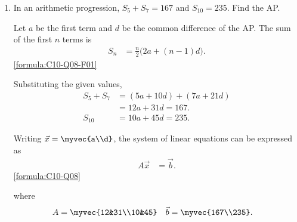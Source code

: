 \begin{enumerate}[label=\thesubsection.\arabic*, ref=\thesubsection.\theenumi]
    The following code verifies the solution.

    \begin{lstlisting}[frame=single, basicstyle=\rmfamily, escapeinside={(*@}{@*)}]
(*@\makebox[\dimexpr\linewidth-2\fboxsep-2\fboxrule\relax][c]{codes/C10/Q03/Q03.py}@*)
    \end{lstlisting}



	\item \label{question:C10-Q08}\label{question-short:C10-Q08}
	In an arithmetic progression, $S_5+S_7=167$ and $S_{10}=235$. Find the AP.
	      \par\smallskip\solution
	      Let $a$ be the first term and $d$ be the common difference of the AP.
	      The sum of the first $n$ terms is
	      \begin{align*}
		      S_n & =\frac n2\bigl(2a+(n-1)d\bigr).
	      \end{align*}
	      \hfill\eqref{formula:C10-Q08-F01}\par

	      Substituting the given values,
	      \begin{align*}
		      S_5+S_7
		      & =(5a+10d)+(7a+21d) \\
		      & =12a+31d=167. \\
		      S_{10}
		      & =10a+45d=235.
	      \end{align*}

	      Writing $\vec{x}=\myvec{a\\d}$, the system of linear equations can be expressed as
	      \begin{align*}
		      A\vec{x} & =\vec{b}.
	      \end{align*}
	      \hfill\eqref{formula:C10-Q08}\par

	      where
	      \begin{align*}
		      A &= \myvec{12&31\\10&45} &
		      \vec{b} &= \myvec{167\\235}.
	      \end{align*}


\end{enumerate}
